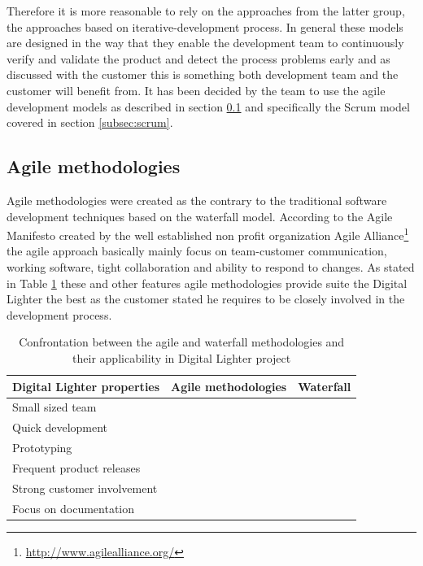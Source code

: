 Therefore it is more reasonable to rely on the approaches from the latter group, the approaches based on iterative-development process. In general these models are designed in the way that they enable the development team to continuously verify and validate the product and detect the process problems early and as discussed with the customer this is something both development team and the customer will benefit from. It has been decided by the team to use the agile development models as described in section \ref{subsec:agile_methodologies} and specifically the Scrum model covered in section \ref{subsec:scrum}.

\subsection{Agile methodologies} \label{subsec:agile_methodologies}
Agile methodologies were created as the contrary to the traditional software development techniques based on the waterfall model. According to the Agile Manifesto \cite{agileManifesto} created by the well established non profit organization Agile Alliance\footnote{\url{http://www.agilealliance.org/}} the agile approach basically mainly focus on team-customer communication, working software, tight collaboration and ability to respond to changes. As stated in Table \ref{tab:agile_vs_waterfall} these and other features agile methodologies provide suite the Digital Lighter the best as the customer stated he requires to be closely involved in the development process.

\begin{table}[htb]
	\begin{center}
	\caption[Confrontation between the agile and waterfall methodologies]{Confrontation between the agile and waterfall methodologies and their applicability in Digital Lighter project}
	\label{tab:agile_vs_waterfall}
	\def\arraystretch{1.3}
		\begin{tabularx}{0.9\textwidth}{ X c c }
		\toprule[0.5mm]
		\textbf{Digital Lighter properties} & \textbf{Agile methodologies} & \textbf{Waterfall} \\
		\midrule
		Small sized team 								& \tick  & \tick 	\\
		Quick development				 				& \tick  & \cross 	\\
		Prototyping										& \tick  & \cross 	\\
		Frequent product releases 						& \tick  & \cross 	\\
		Strong customer involvement 					& \tick  & \cross 	\\
		Focus on documentation 							& \cross & \tick  	\\
		\bottomrule[0.5mm]
		\end{tabularx}
	\end{center}
\end{table}


